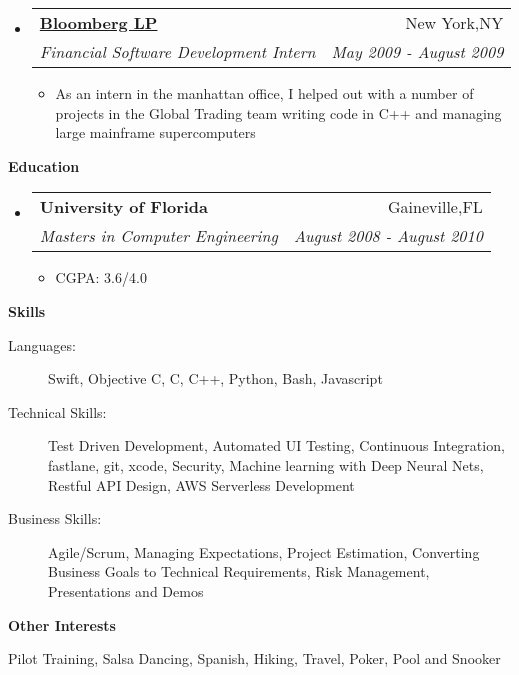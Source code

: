 \documentclass[letterpaper,11pt]{article}
\makeatletter
\newcommand{\resitem}[1]{\item #1 \vspace{-2pt}}
\newcommand{\resheading}[1]{{\large \colorbox{mygrey}{\begin{minipage}{\textwidth}{\textbf{#1 \vphantom{p\^{E}}}}\end{minipage}}}}
\newcommand{\ressubheading}[4]{
\begin{tabular*}{7.0in}{l@{\extracolsep{\fill}}r}
    \textbf{#1} & #2 \\
    \textit{#3} & \textit{#4} \\
\end{tabular*}\vspace{-6pt}}
\makeatother
\begin{document}
\begin{itemize}
\item
    \ressubheading{\href{http://www.bloomberg.com}{Bloomberg LP}}{New York,NY}{Financial Software Development Intern}{May 2009 - August 2009}
    \begin{itemize}
      \resitem{As an intern in the manhattan office, I helped out with a number of projects in the Global Trading team writing code in C++ and managing large mainframe supercomputers}
    \end{itemize}
    
    
\end{itemize}

\vspace{0.3in}
  
\resheading{Education}
\begin{itemize}
\item
    \ressubheading{University of Florida}{Gaineville,FL}{{Masters in Computer Engineering}}{August 2008 - August 2010}
    \begin{itemize}
        \resitem{CGPA: 3.6/4.0}
    \end{itemize}
\end{itemize}

\vspace{0.3in}

\resheading{Skills}
\begin{description}
\item[Languages:]
Swift, Objective C, C, C++, Python, Bash, Javascript
\item[Technical Skills:] Test Driven Development, Automated UI Testing, Continuous Integration, fastlane, git, xcode, Security,
Machine learning with Deep Neural Nets, Restful API Design, AWS Serverless Development
\item[Business Skills:]
Agile/Scrum, Managing Expectations, Project Estimation, Converting Business Goals to Technical Requirements, Risk Management, Presentations and Demos
\end{description}

\vspace{0.2in}

\resheading{Other Interests}
\begin{description}
\item Pilot Training, Salsa Dancing, Spanish, Hiking, Travel, Poker, Pool and Snooker
\end{description}
\end{document}
